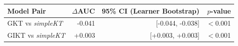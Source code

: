 \begin{tabular}{lrrr}
\toprule
\textbf{Model Pair} & $\Delta$\textbf{AUC} & \textbf{95\% CI (Learner Bootstrap)} & \textbf{$p$-value} \\
\midrule
GKT vs \textit{simpleKT} & -0.041 & [-0.044, -0.038] & $<$0.001 \\
GIKT vs \textit{simpleKT} & +0.003 & [+0.003, +0.003] & $<$0.001 \\
\bottomrule
\end{tabular}